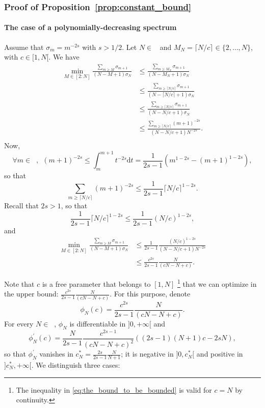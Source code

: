 \documentclass[twoside,11pt]{book}
\DeclareMathOperator{\Ns}{\mathbb{N}^{*}}
\begin{document}
\subsubsection{Proof of Proposition~\ref{prop:constant_bound}}
\paragraph{The case of a polynomially-decreasing spectrum}
Assume that $\sigma_{m} = m^{-2s}$ with $s>1/2$.
Let $N \in \Ns$ and $M_{N} = \lceil{N/c \rceil} \in \{2,\dots,N\}$, with $c \in [1,N[$.
We have
\begin{align}
\min_{M \in [2:N]}\frac{\sum_{m \geq M} \sigma_{m+1}}{(N-M+1)\sigma_N} & \leq \frac{\sum_{m \geq M_N} \sigma_{m+1}}{(N-M_N+1)\sigma_N} \\
& \leq \frac{\sum_{m \geq \lceil{N/c\rceil}} \sigma_{m+1}}{(N-\lceil{N/c\rceil}+1)\sigma_N} \\
& \leq \frac{\sum_{m \geq \lceil{N/c\rceil}} \sigma_{m+1}}{(N-N/c+1)\sigma_N}\\
& \leq \frac{\sum_{m \geq \lceil{N/c\rceil}} (m+1)^{-2s}}{(N-N/c+1)N^{-2s}}.\\
\end{align}
Now,
\begin{equation}
\forall m \in \Ns, \:\: (m+1)^{-2s} \leq \int_{m}^{m+1}t^{-2s} \mathrm{d}t = \frac{1}{2s-1}(m^{1-2s}-(m+1)^{1-2s}),
\end{equation}
so that
\begin{equation}
\sum\limits_{m \geq \lceil{N/c\rceil}} (m+1)^{-2s} \leq \frac{1}{2s-1}\lceil{N/c\rceil}^{1-2s}.
\end{equation}
Recall that $2s>1$, so that
\begin{equation}
\frac{1}{2s-1}\lceil{N/c\rceil}^{1-2s} \leq \frac{1}{2s-1}(N/c)^{1-2s},
\end{equation}
and
\begin{align}
\min_{M \in [2:N]}\frac{\sum_{m \geq M} \sigma_{m+1}}{(N-M+1)\sigma_N}
& \leq \frac{1}{2s-1}\frac{(N/c)^{1-2s}}{(N-N/c+1)N^{-2s}}\\
& \leq \frac{c^{2s}}{2s-1}\frac{N}{(cN-N+c)} \label{eq:the_bound_to_be_bounded}.
\end{align}

Note that $c$ is a free parameter that belongs to $[1,N]$ \footnote{The inequality in \eqref{eq:the_bound_to_be_bounded} is valid for $c = N$ by continuity.} that we can optimize in the upper bound: $\frac{c^{2s}}{2s-1}\frac{N}{(cN-N+c)}$. For this purpose, denote
\begin{equation}
\phi_{N}(c) = \frac{c^{2s}}{2s-1}\frac{N}{(cN-N+c)}.
\end{equation}
For every $N \in \Ns$, $\phi_{N}$ is differentiable in $]0,+\infty[$ and
\begin{equation}
\phi_{N}^{'}(c) = \frac{N}{2s-1}\frac{c^{2s-1}}{(cN-N+c)^{2}} \left( (2s-1)(N+1) c - 2s N \right),
\end{equation}
so that $\phi_{N}^{'}$ vanishes in $c_{N}^{*} = \frac{2s}{2s-1} \frac{N}{N+1}$; it is negative in $]0,c_{N}^{*}[$ and positive in $]c_{N}^{*}, +\infty[$. We distinguish three cases:
\end{document}

